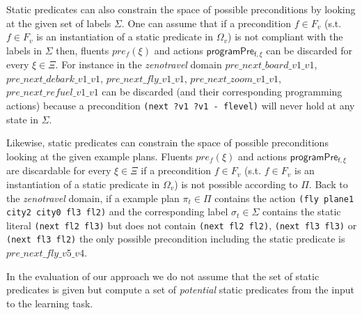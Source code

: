 \documentclass[letterpaper]{article} %
\begin{document}
Static predicates can also constrain the space of possible preconditions by looking at the given set of labels $\Sigma$. One can assume that if a precondition $f\in F_v$ (s.t. $f\in F_v$ is an instantiation of a static predicate in $\Omega_v$) is not compliant with the labels in $\Sigma$ then, fluents $pre_f(\xi)$ and actions $\mathsf{programPre_{f,\xi}}$ can be discarded for every $\xi\in\Xi$. For instance in the {\em zenotravel} domain $pre\_next\_board\_v1\_v1$, $pre\_next\_debark\_v1\_v1$, $pre\_next\_fly\_v1\_v1$, $pre\_next\_zoom\_v1\_v1$, $pre\_next\_refuel\_v1\_v1$ can be discarded (and their corresponding programming actions) because a precondition {\tt\small(next ?v1 ?v1 - flevel)} will never hold at any state in $\Sigma$.

Likewise, static predicates can constrain the space of possible preconditions looking at the given example plans. Fluents $pre_f(\xi)$ and actions $\mathsf{programPre_{f,\xi}}$ are discardable for every $\xi\in\Xi$ if a precondition $f\in F_v$ (s.t. $f\in F_v$ is an instantiation of a static predicate in $\Omega_v$) is not possible according to $\Pi$. Back to the {\em zenotravel} domain, if a example plan $\pi_t\in \Pi$ contains the action {\tt\small (fly plane1 city2 city0 fl3 fl2)} and the corresponding label $\sigma_t\in\Sigma$ contains the static literal {\tt\small (next fl2 fl3)} but does not contain {\tt\small (next fl2 fl2)}, {\tt\small (next fl3 fl3)} or {\tt\small (next fl3 fl2)} the only possible precondition including the static predicate is $pre\_next\_fly\_v5\_v4$.

In the evaluation of our approach we do not assume that the set of static predicates is given but compute a set of {\em potential} static predicates from the input to the learning task.
\end{document}
